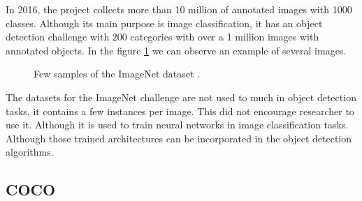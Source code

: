 In 2016, the project collects more than 10 million of annotated images with 1000 classes. Although its main purpose is image classification, it has an object detection challenge with $200$ categories with over a 1 million images with annotated objects. In the figure \ref{imagenetdata22} we can observe an example of several images.

\begin{figure}[H]
		
\centering
{}
\caption{Few samples of the ImageNet dataset .} \label{imagenetdata22}

\end{figure}

The datasets for the ImageNet challenge are not used to much in object detection tasks, it contains a few instances per image. This did not encourage researcher to use it. Although it is used to train 
neural networks in image classification tasks. Although those trained architectures can be incorporated in the object detection algorithms.


\subsection{COCO}


